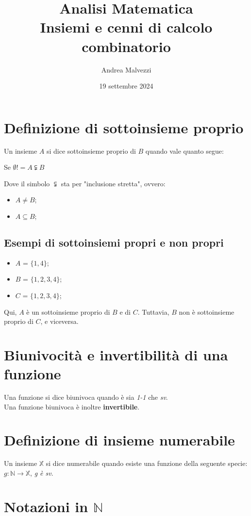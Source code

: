 \documentclass[12pt]{article}
\title{\textbf{Analisi Matematica\\Insiemi e cenni di calcolo combinatorio}}
\date{19 settembre 2024}
\author{Andrea Malvezzi}
\begin{document}
\maketitle
\pagebreak
\tableofcontents
\pagebreak
\section{Definizione di sottoinsieme proprio}
Un insieme $A$ si dice sottoinsieme proprio di $B$ quando vale quanto segue:
\begin{center}
    Se $\emptyset != A \subsetneqq B$
\end{center}
Dove il simbolo $\subsetneqq$ sta per "inclusione stretta", ovvero:
\begin{itemize}
    \item $A \not= B$;
    \item $A \subseteq B$;
\end{itemize}
\subsection{Esempi di sottoinsiemi propri e non propri}
\begin{itemize}
    \item $A$ = $\{1, 4\}$;
    \item $B$ = $\{1, 2, 3, 4\}$;
    \item $C$ = $\{1, 2, 3, 4\}$;
\end{itemize}
Qui, $A$ è un sottoinsieme proprio di $B$ e di $C$. Tuttavia, $B$ non è sottoinsieme proprio di $C$, e viceversa.
\section{Biunivocità e invertibilità di una funzione}
Una funzione si dice biunivoca quando è sia \textit{1-1} che \textit{sv}.\\
Una funzione biunivoca è inoltre \textbf{invertibile}.
\section{Definizione di insieme numerabile}
Un insieme $\mathbb{X}$ si dice numerabile quando esiste una funzione della seguente specie:\\
$g: \mathbb{N} \rightarrow \mathbb{X}$, \textit{g è sv}.
\pagebreak
\section{Notazioni in $\mathbb{N}$}
\end{document}
